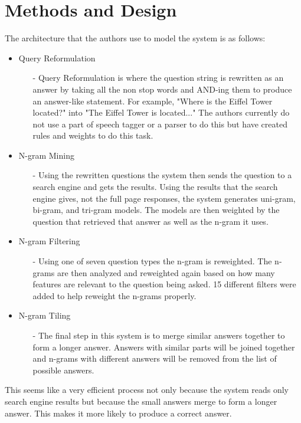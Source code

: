 \documentclass[journal, a4paper]{IEEEtran}
\begin{document}
\section{Methods and Design}
The architecture that the authors use to model the system is as follows:
\begin{itemize}
\item Query Reformulation
	\begin{itemize}
	\item[-] Query Reformulation is where the question string is rewritten as an answer by taking all the non stop words and AND-ing them to produce an answer-like statement. For example, "Where is the Eiffel Tower located?" into "The Eiffel Tower is located..." The authors currently do not use a part of speech tagger or a parser to do this but have created rules and weights to do this task.  
	\end{itemize}
\item N-gram Mining
	\begin{itemize}
	\item[-] Using the rewritten questions the system then sends the question to a search engine and gets the results. Using the results that the search engine gives, not the full page responses, the system generates uni-gram, bi-gram, and tri-gram models. The models are then weighted by the question that retrieved that answer as well as the n-gram it uses.
	\end{itemize}
\item N-gram Filtering
	\begin{itemize}
	\item[-] Using one of seven question types the n-gram is reweighted. The n-grams are then analyzed and reweighted again based on how many features are relevant to the question being asked. 15 different filters were added to help reweight the n-grams properly.
	\end{itemize}
\item N-gram Tiling
	\begin{itemize}
	\item[-] The final step in this system is to merge similar answers together to form a longer answer. Answers with similar parts will be joined together and n-grams with different answers will be removed from the list of possible answers.
	\end{itemize}
\end{itemize}
This seems like a very efficient process not only because the system reads only search engine results but because the small answers merge to form a longer answer. This makes it more likely to produce a correct answer.
\end{document}
